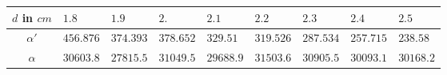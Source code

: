 \begin{tabular}{c|*{8}{*{1}{l}}}
$d$ in ${\si{cm}}$ & $1.8$ & $1.9$ & $2.$ & $2.1$ & $2.2$ & $2.3$ & $2.4$ & $2.5$ \\ \hline
$\alpha'$ & $456.876$ & $374.393$ & $378.652$ & $329.51$ & $319.526$ & $287.534$ & $257.715$ & $238.58$ \\ \hline
$\alpha$ & $30603.8$ & $27815.5$ & $31049.5$ & $29688.9$ & $31503.6$ & $30905.5$ & $30093.1$ & $30168.2$\end{tabular}
